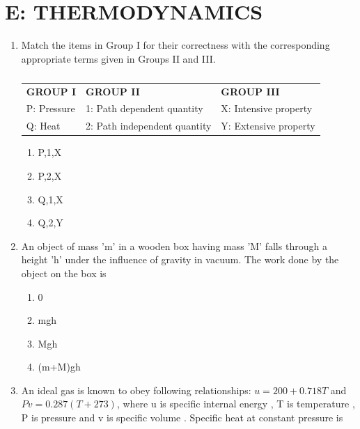 \documentclass[a4paper,10pt]{article}
\begin{document}
\section*{E: THERMODYNAMICS}
\begin{enumerate}
\item Match the items in Group I for their correctness with the corresponding appropriate terms given in Groups II and III.
\begin{table}[H]
\centering
\begin{tabular}{lll}
\textbf{GROUP I} & \textbf{GROUP II} & \textbf{GROUP III} \\
P: Pressure & 1: Path dependent quantity & X: Intensive property \\
Q: Heat & 2: Path independent quantity & Y: Extensive property \\
\end{tabular}
\caption*{}
\label{tab:q1_thermo}
\end{table}
\hfill{}

\begin{multicols}{4}
\begin{enumerate}
\item P,1,X
\item P,2,X
\item Q,1,X
\item Q,2,Y
\end{enumerate}
\end{multicols}

\item An object of mass 'm' in a wooden box having mass 'M' falls through a height 'h' under the influence of gravity in vacuum. The work done by the object on the box is
\begin{flushright}
\end{flushright}

\begin{multicols}{4}
\begin{enumerate}
\item 0
\item mgh
\item Mgh
\item (m+M)gh
\end{enumerate}
\end{multicols}

\item An ideal gas is known to obey following relationships: $u = 200 + 0.718T$ and $Pv = 0.287(T + 273)$, where u is specific internal energy , T is temperature , P is pressure  and v is specific volume . Specific heat  at constant pressure is
\hfill{}


\end{enumerate}
\end{document}
